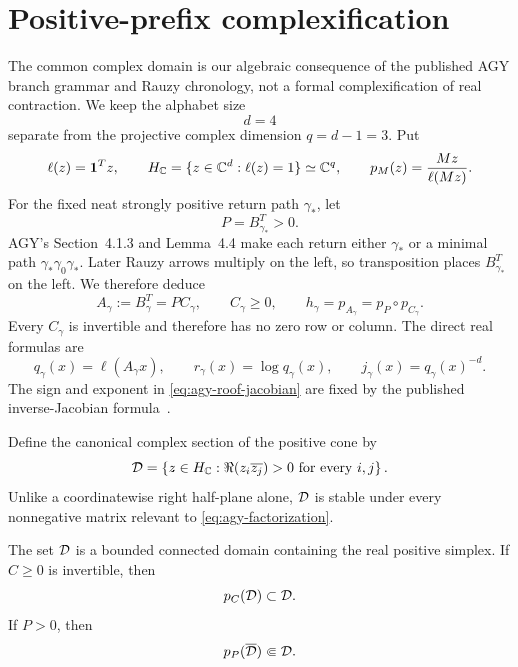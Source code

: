 \section{Positive-prefix complexification}
\label{sec:complex-domain}

The common complex domain is our algebraic consequence of the published AGY
branch grammar and Rauzy chronology, not a formal complexification of real
contraction.  We keep the alphabet
size
\[
 d=4
\]
separate from the projective complex dimension \(q=d-1=3\).  Put
\[
 \ell(z)=\mathbf{1}^Tz,
 \qquad
 H_{\mathbb{C}}=\{z\in\mathbb{C}^d:\ell(z)=1\}\simeq\mathbb{C}^q,
 \qquad
 p_M(z)=\frac{Mz}{\ell(Mz)}.
\]
For the fixed neat strongly positive return path \(\gamma_*\), let
\[
 P=B_{\gamma_*}^T>0.
\]
AGY's Section~4.1.3 and Lemma~4.4 make each return either \(\gamma_*\) or a
minimal path \(\gamma_*\gamma_0\gamma_*\)\citep[pp.~162, 165]{agy2006}.
Later Rauzy arrows multiply on the left, so transposition places
\(B_{\gamma_*}^T\) on the left.  We therefore deduce
\begin{equation}
 A_\gamma:=B_\gamma^T=P C_\gamma,
 \qquad C_\gamma\geq0,
 \qquad h_\gamma=p_{A_\gamma}=p_P\circ p_{C_\gamma}.
 \label{eq:agy-factorization}
\end{equation}
Every \(C_\gamma\) is invertible and therefore has no zero row or column.
The direct real formulas are
\begin{equation}
 q_\gamma(x)=\ell(A_\gamma x),\qquad
 r_\gamma(x)=\log q_\gamma(x),\qquad
 j_\gamma(x)=q_\gamma(x)^{-d}.
 \label{eq:agy-roof-jacobian}
\end{equation}
The sign and exponent in \eqref{eq:agy-roof-jacobian} are fixed by the
published inverse-Jacobian formula~\citep{agy2006}.

Define the canonical complex section of the positive cone by
\begin{equation}
 \mathcal{D}=
 \left\{z\in H_{\mathbb{C}}:
 \Re(z_i\overline{z_j})>0\text{ for every }i,j\right\}.
 \label{eq:complex-cone}
\end{equation}
Unlike a coordinatewise right half-plane alone, \(\mathcal{D}\) is stable under
every nonnegative matrix relevant to \eqref{eq:agy-factorization}.

\begin{lemma}
\label{lem:complex-cone}
The set \(\mathcal{D}\) is a bounded connected domain containing the real positive
simplex.  If \(C\geq0\) is invertible, then
\[
 p_C(\mathcal{D})\subset\mathcal{D}.
\]
If \(P>0\), then
\[
 p_P(\overline{\mathcal{D}})\Subset\mathcal{D}.
\]
\end{lemma}

